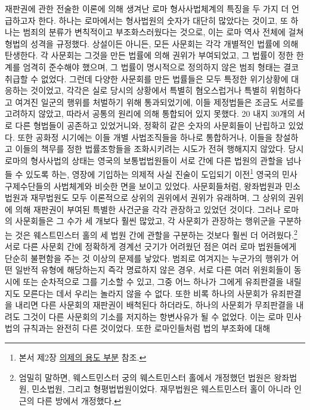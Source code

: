 재판권에 관한 전술한 이론에 의해 생겨난
로마 형사사법체계의 특징을 두 가지 더 언급하고자 한다.
하나는 로마에서는 형사법원의 숫자가 대단히 많았다는 것이고,
또 하나는
범죄의 분류가 변칙적이고 부조화스러웠다는 것으로, 이는
로마 역사 전체에 걸쳐 형법의 성격을 규정했다.
상설이든 아니든, 모든 사문회는
각각 개별적인 법률에 의해 탄생한다.
각 사문회는 그것을 만든 법률에 의해 권위가 부여되었고,
그 법률이 정한 한계를 엄격히 준수해야 했으며,
그 법률이 명시적으로 정의하지 않은 범죄 형태는 결코 취급할 수 없었다.
그런데 다양한 사문회를 만든 법률들은
모두 특정한 위기상황에 대응하는 것이었고,
각각은 실로 당시의 상황에서
특별히 혐오스럽거나 특별히 위험하다고 여겨진
일군의 행위를 처벌하기 위해 통과되었기에,
이들 제정법들은 조금도 서로를 고려하지 않았고,
따라서 공통의 원리에 의해 통합되어 있지 못했다.
20 내지 30개의 서로 다른 형법들이 공존하고 있었거니와,
정확히 같은 숫자의 사문회들이 난립하고 있었다.
또한 공화정 시기에는
이들 개별 사법조직들을 하나로 통합하거나,
이들을 창설하고 이들의 책무를 정한 법률조항들을 조화시키려는
시도가 전혀 행해지지 않았다.
당시 로마의 형사사법의 상태는
영국의 보통법법원들이
서로 간에 다른 법원의 관할을 넘나들 수 있도록 하는,
영장에 기입하는
의제적 사실 진술이
도입되기 이전\footnote{%
  본서 제2장 \hyperlink{commonlawfiction}{의제의 용도 부분} 참조.}
영국의 민사 구제수단들의 사법체계와
비슷한 면을 보이고 있었다.
사문회들처럼,
왕좌법원과 민소법원과 재무법원도 모두
이론적으로
상위의 권위에서 권위가 유래하며,
그 상위의 권위에 의해 재판권이 부여된
특별한 사건군을 각각 관장하고 있었던 것이다.
그러나 로마의 사문회들은 그 수가 세 개보다 훨씬 많았고,
각 사문회가 관장하는 행위군을 구분하는 것은
웨스트민스터 홀의 세 법원 간에 관할을 구분하는 것보다
훨씬 더 어려웠다.\footnote{%
  엄밀히 말하면, 웨스트민스터 궁의 웨스트민스터 홀에서
  개정했던 법원은 왕좌법원, 민소법원, 그리고 형평법법원이었다.
  재무법원은 웨스트민스터 홀이 아니라 인근의 다른 방에서 개정했다.
  }
서로 다른 사문회 간에 정확하게 경계선 긋기가 어려웠던 점은
여러 로마 법원들에게 단순히 불편함을 주는 것 이상의 문제를 낳았다.
범죄로 여겨지는 누군가의 행위가 어떤 일반적 유형에 해당하는지
즉각 명료하지 않은 경우,
서로 다른 여러 위원회들이
동시에 또는 순차적으로 그를 기소할 수 있고,
그중 어느 하나가
그에게 유죄판결을 내릴지도 모른다는 데서
우리는 놀라지 않을 수 없다.
또한 비록 하나의 사문회가 유죄판결을 내리면
다른 사문회의 재판권이 배척된다 하더라도,
하나의 사문회가 무죄판결을 내려도 그것이
다른 사문회의 기소를 저지하는 항변사유가 될 수 없었다.
이는 로마 민사법의 규칙과는 완전히 다른 것이었다.
또한 로마인들처럼 법의 부조화에 대해
